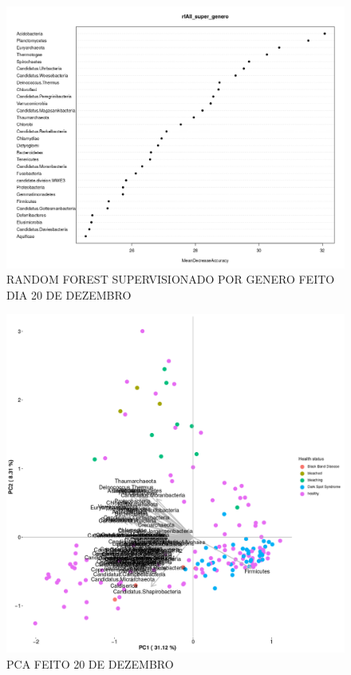 \documentclass[12pt, a4paper]{report}
\begin{document}
\begin{figure}[H]
	\centering
	\includegraphics[scale=0.3]{figures/RF_super_genero_2018_12_20.png}
	\caption{RANDOM FOREST SUPERVISIONADO POR GENERO FEITO DIA 20 DE DEZEMBRO}
	\label{fig: RANDOM FOREST SUPERVISIONADO POR GENERO FEITO DIA 20 DE DEZEMBRO}
\end{figure}

\begin{figure}[H]
	\centering
	\includegraphics[scale=0.4]{figures/PCA_health_corais_2018_12_20_edited.png}
	\caption{PCA FEITO 20 DE DEZEMBRO}
	\label{fig:PCAGERALFEITODIA20DEDEZEMBROVISUALIZANDOCATEGORIASAÚDE}
\end{figure}
\end{document}
